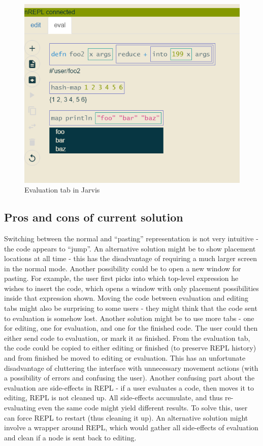 \documentclass[11pt]{scrartcl}
\begin{document}
\begin{figure}[hbt]
  \includegraphics[scale=0.3]{img/j-eval_f}
  \caption{Evaluation tab in Jarvis}
  \label{j-eval}
\end{figure}



\subsection{Pros and cons of current solution}
Switching between the normal and “pasting” representation is not very intuitive - the code appears to “jump”. An alternative solution might be to show placement locations at all time - this has the disadvantage of requiring a much larger screen in the normal mode. Another possibility could be to open a new window for pasting. For example, the user first picks into which top-level expression he wishes to insert the code, which opens a window with only placement possibilities inside that expression shown. 
Moving the code between evaluation and editing tabs might also be surprising to some users - they might think that the code sent to evaluation is somehow lost. Another solution might be to use more tabs - one for editing, one for evaluation, and one for the finished code. The user could then either send code to evaluation, or mark it as finished. From the evaluation tab, the code could be copied to either editing or finished (to preserve REPL history) and from finished be moved to editing or evaluation. This has an unfortunate disadvantage of cluttering the interface with unnecessary movement actions (with a possibility of errors and confusing the user).
Another confusing part about the evaluation are side-effects in REPL - if a user evaluates a code, then moves it to editing, REPL is not cleaned up. All side-effects accumulate, and thus re-evaluating even the same code might yield different results. To solve this, user can force REPL to restart (thus cleaning it up). An alternative solution might involve a wrapper around REPL, which would gather all side-effects of evaluation and clean if a node is sent back to editing.
\end{document}
